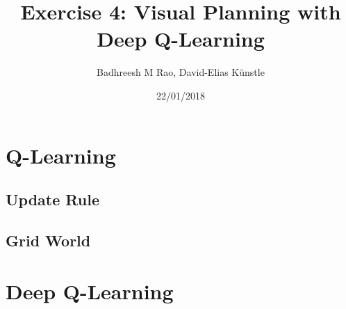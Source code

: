 \documentclass[a4paper,14pt]{article}
\begin{document}
\title{Exercise 4: Visual Planning with Deep Q-Learning}
\author{Badhreesh M Rao, David-Elias K\"unstle}
\date{22/01/2018}
\maketitle
\section{Q-Learning}
\subsection{Update Rule}
\subsection{Grid World}
\section{Deep Q-Learning}


\end{document}
